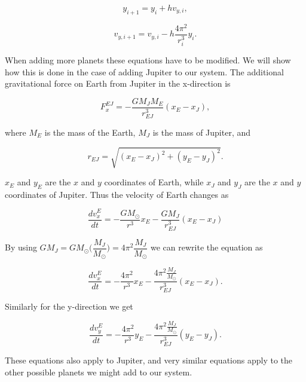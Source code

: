 \documentclass[a4paper, fontsize=11pt]{article}
\begin{document}
\begin{equation}
y_{i+1} = y_{i} + h v_{y,i},
\end{equation}

\begin{equation}
v_{y,i+1} = v_{y,i} - h \dfrac{4 \pi^2}{r_{i}^3}y_{i}.
\end{equation}

When adding more planets these equations have to be modified. We will show how this is done in the case of adding Jupiter to our system. The additional gravitational force on Earth from Jupiter in the x-direction is 

\begin{equation}
F_{x}^{EJ} = -\dfrac{G M_{J} M_{E}}{r^3_{EJ}}(x_{E} - x_{J}),
\end{equation}

where $M_{E}$ is the mass of the Earth, $M_{J}$ is the mass of Jupiter, and 

\begin{equation}
r_{EJ}=\sqrt{(x_{E}-x_{J})^2 + (y_{E}- y_{J})^2 }.
\end{equation}

$x_{E}$ and $y_{E}$ are the $x$ and $y$ coordinates of Earth, while $x_{J}$ and $y_{J}$ are the $x$ and $y$ coordinates of Jupiter. Thus the velocity of Earth changes as

\begin{equation}
\dfrac{dv_{x}^{E}}{dt}=-\dfrac{G M_{\odot}}{r^3}x_{E} - \dfrac{G M_{J}}{r_{EJ}^3}(x_{E}-x_{J})
\end{equation}

By using $G M_{J} = G M_{\odot} \Big(\dfrac{M_{J}}{M_{\odot}}\Big)=4\pi^2 \dfrac{M_{J}}{M_{\odot}}$ we can rewrite the equation as

\begin{equation}
\dfrac{dv_{x}^{E}}{dt}=-\dfrac{4\pi^2}{r^3}x_{E} - \dfrac{4\pi^2 \frac{M_{J}}{M_{\odot}} }{r_{EJ}^3}(x_{E}-x_{J}).
\end{equation}

Similarly for the y-direction we get

\begin{equation}
\dfrac{dv_{y}^{E}}{dt}=-\dfrac{4\pi^2}{r^3}y_{E} - \dfrac{4\pi^2 \frac{M_{J}}{M_{\odot}} }{r_{EJ}^3}(y_{E}-y_{J}).
\end{equation}

These equations also apply to Jupiter, and very similar equations apply to the other possible planets we might add to our system. \cite{ODE}
\end{document}
